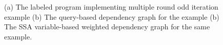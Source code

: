 \begin{example}
{\begin{figure}
\begin{subfigure}{0.3\textwidth}
\begin{tikzpicture}[scale=\textwidth/18cm,samples=200]
\end{tikzpicture}
\caption{}
    \end{subfigure}
    \vspace{-0.3cm}
\caption{(a) The labeled program implementing multiple round odd iteration example (b) The query-based dependency graph for the example (b) The SSA variable-based weighted dependency graph for the same example.}
    \label{fig:overappr_example}
    \vspace{-0.5cm}
\end{figure}
}
%
\end{example}
%
